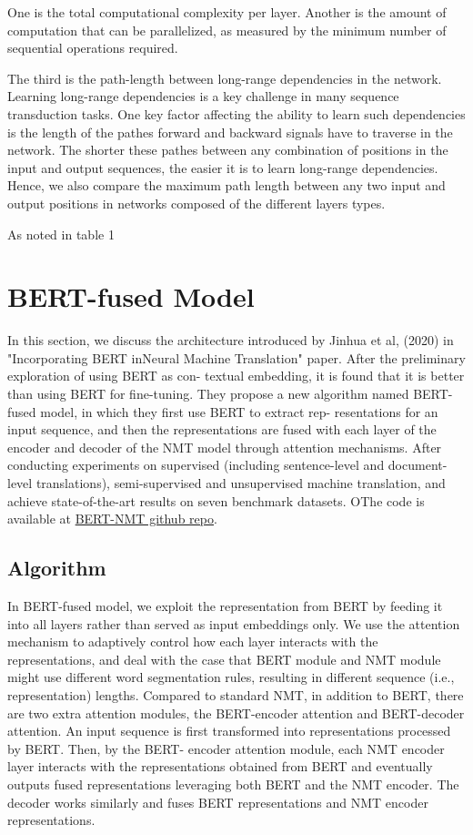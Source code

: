 \documentclass{report}
\begin{document}
One is the total computational complexity per layer. Another is the amount of computation that can be parallelized, as measured by the minimum number of sequential operations required.

The third is the path-length between long-range dependencies in the network. Learning long-range dependencies is a key challenge in many sequence transduction tasks. One key factor affecting the ability to learn such dependencies is the length of the pathes forward and backward signals have to traverse in the network. The shorter these pathes between any combination of positions in the input and output sequences, the easier it is to learn long-range dependencies. Hence, we also compare the maximum path length between any two input and output positions in networks composed of the different layers types.

As noted in table 1
\fi

\section{BERT-fused Model}
\label{sec:bert-nmt}
In this section, we discuss the architecture introduced by Jinhua et al, (2020) in "Incorporating BERT inNeural Machine Translation" paper. After the preliminary exploration of using BERT as con- textual embedding, it is found that it is better than using BERT for fine-tuning. They propose a new algorithm named BERT-fused model, in which they first use BERT to extract rep- resentations for an input sequence, and then the representations are fused with each layer of the encoder and decoder of the NMT model through attention mechanisms. After conducting experiments on supervised (including sentence-level and document-level translations), semi-supervised and unsupervised machine translation, and achieve state-of-the-art results on seven benchmark datasets. OThe code is available at \href{https://github.com/bert-nmt/bert- nmt}{BERT-NMT github repo}.

\subsection{Algorithm}
\label{ssec:bert-nmt-algorithm}
In BERT-fused model, we exploit the representation from BERT by feeding it into all layers rather than served as input embeddings only. We use the attention mechanism to adaptively control how each layer interacts with the representations, and deal with the case that BERT module and NMT module might use different word segmentation rules, resulting in different sequence (i.e., representation) lengths. Compared to standard NMT, in addition to BERT, there are two extra attention modules, the BERT-encoder attention and BERT-decoder attention. An input sequence is first transformed into representations processed by BERT. Then, by the BERT- encoder attention module, each NMT encoder layer interacts with the representations obtained from BERT and eventually outputs fused representations leveraging both BERT and the NMT encoder. The decoder works similarly and fuses BERT representations and NMT encoder representations.
\end{document}

